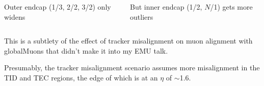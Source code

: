 \documentclass[compress]{beamer}
\begin{document}
\begin{frame}
\begin{columns}
\vspace{0.2 cm}
Outer endcap (1/3, 2/2, 3/2) only widens

\vspace{0.2 cm}
But inner endcap (1/2, $N$/1) gets more outliers

\end{columns}
\end{frame}

\begin{notes}
\item This is a subtlety of the effect of tracker misalignment on muon
alignment with globalMuons that didn't make it into my EMU talk.
\item Presumably, the tracker misalignment scenario assumes more
misalignment in the TID and TEC regions, the edge of which is at an
$\eta$ of $\sim$1.6.
\end{notes}
\end{document}
